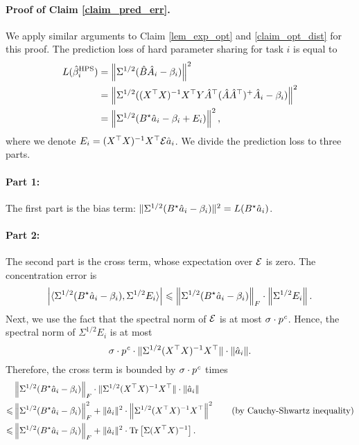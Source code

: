	\paragraph{Proof of Claim \ref{claim_pred_err}.}
	We apply similar arguments to Claim \ref{lem_exp_opt} and \ref{claim_opt_dist} for this proof.
	The prediction loss of hard parameter sharing for task $i$ is equal to
	\begin{align*}
		L(\hat{\beta}_i^{\textup{HPS}}) &= \left\| \Sigma^{1/2} (\hat{B} \hat{A}_i - \beta_i) \right\|^2 \\
		&= \left\| \Sigma^{1/2} ((X^{\top} X)^{-1} X^{\top} Y \hat{A}^{\top} (\hat{A} \hat{A}^{\top})^{+} \hat{A}_i - \beta_i) \right\|^2 \\
		&= \left\| \Sigma^{1/2} (B^{\star} \hat{a}_i - \beta_i + E_i) \right\|^2,
	\end{align*}
	where we denote $E_i = (X^{\top} X)^{-1} X^{\top} \mathcal{E} \hat{a}_i$.
	We divide the prediction loss to three parts.

	\paragraph{Part 1:} The first part is the bias term:
	$\|\Sigma^{1/2} (B^{\star} \hat{a}_i - \beta_i)\|^2 = L(B^{\star} \hat{a}_i)$.

	\paragraph{Part 2:} The second part is the cross term, whose expectation over $\mathcal{E}$ is zero. The concentration error is
	\begin{align*}
		{\left| {\langle \Sigma^{1/2}(B^{\star} \hat{a}_i - \beta_i), \Sigma^{1/2}E_i \rangle} \right|}
		\leqslant \left\| \Sigma^{1/2} (B^{\star} \hat{a}_i - \beta_i) \right\|_{F} \cdot \left\| \Sigma^{1/2} E_i \right\|.
	\end{align*}
	Next, we use the fact that the spectral norm of $\mathcal{E}$ is at most $\sigma \cdot p^{{\mathit{c}}}$.
	Hence, the spectral norm of $\Sigma^{1/2} E_i$ is at most
		\[ \sigma \cdot p^{{\mathit{c}}} \cdot \|\Sigma^{1/2} (X^{\top} X)^{-1} X^{\top}\| \cdot \|\hat{a}_i\|. \]
	Therefore, the cross term is bounded by $\sigma \cdot p^{{\mathit{c}}}$ times
	\begin{align*}
			& \left\| \Sigma^{1/2} (B^{\star} \hat{a}_i - \beta_i) \right\|_{F} \cdot \|\Sigma^{1/2} (X^{\top} X)^{-1} X^{\top}\| \cdot \|\hat{a}_i\| \\
		\leqslant & \left\| \Sigma^{1/2} (B^{\star} \hat{a}_i - \beta_i) \right\|_{F}^2 + \|\hat{a}_i\|^2 \cdot \left\| \Sigma^{1/2} (X^{\top} X)^{-1} X^{\top} \right\|^2 \tag{by Cauchy-Shwartz inequality} \\
		\leqslant & \left\| \Sigma^{1/2}(B^{\star} \hat{a}_i - \beta_i) \right\|_{F} + \|\hat{a}_i\|^2 \cdot \operatorname{Tr}\left[\Sigma (X^{\top} X)^{-1}\right].
	\end{align*}

